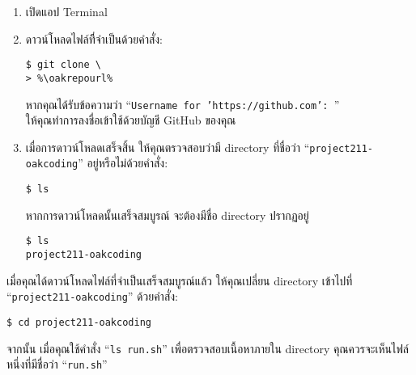 \begin{enumerate}
\setlength{\itemsep}{0.7pt}
    \item เปิดแอป Terminal


    \item ดาวน์โหลดไฟล์ทีี่จำเป็นด้วยคำสั่ง:

\begin{lstlisting}[numbers=none]
$ git clone \
> %\oakrepourl%
\end{lstlisting}

    หากคุณได้รับข้อความว่า ``\texttt{Username for 'https://github.com': }''\\
    ให้คุณทำการลงชื่อเข้าใช้ด้วยบัญชี GitHub ของคุณ

    \item เมื่อการดาวน์โหลดเสร็จสิ้น ให้คุณตรวจสอบว่ามี directory ที่ชื่อว่า ``\mbox{\texttt{project211-oakcoding}}'' อยู่หรือไม่ด้วยคำสั่ง:

\begin{lstlisting}[numbers=none]
$ ls
\end{lstlisting}

    หากการดาวน์โหลดนั้นเสร็จสมบูรณ์ จะต้องมีชื่อ directory ปรากฏอยู่

\begin{lstlisting}[numbers=none]
$ ls
project211-oakcoding
\end{lstlisting}
\end{enumerate}

เมื่อคุณได้ดาวน์โหลดไฟล์ที่จำเป็นเสร็จสมบูรณ์แล้ว ให้คุณเปลี่ยน directory เข้าไปที่ ``\texttt{project211-oakcoding}'' ด้วยคำสั่ง:

\begin{lstlisting}[numbers=none]
$ cd project211-oakcoding
\end{lstlisting}

\pagebreak[3]

จากนั้น เมื่อคุณใช้คำสั่ง ``\texttt{ls run.sh}'' เพื่อตรวจสอบเนื้อหาภายใน directory คุณควรจะเห็นไฟล์หนึ่งที่มีชื่อว่า ``\texttt{run.sh}''

